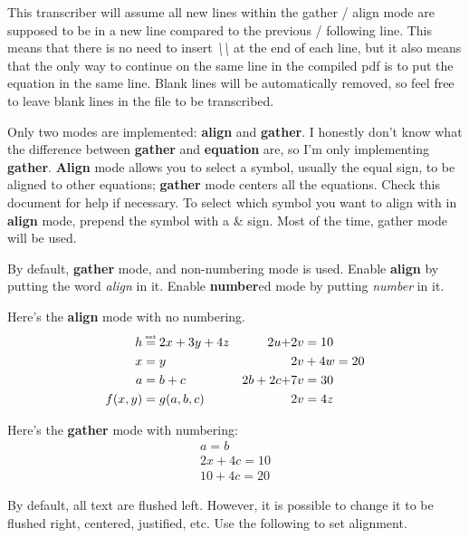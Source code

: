 \documentclass[12pt]{article}
\newcommand{\pytexset}{\mathrel{\stackrel{\makebox[0pt]{\mbox{\normalfont\tiny set}}}{=}}}
\begin{document}
\begin{flushleft}
\medskip

This transcriber will assume all new lines within the gather / align mode are supposed to be in a new line compared to the previous / following line. This means that there is no need to insert \emph{\textbackslash\textbackslash} at the end of each line, but it also means that the only way to continue on the same line in the compiled pdf is to put the equation in the same line. Blank lines will be automatically removed, so feel free to leave blank lines in the file to be transcribed.

\medskip

Only two modes are implemented: \textbf{align} and \textbf{gather}. I honestly don't know what the difference between \textbf{gather} and \textbf{equation} are, so I'm only implementing \textbf{gather}. \textbf{Align} mode allows you to select a symbol, usually the equal sign, to be aligned to other equations; \textbf{gather} mode centers all the equations. Check this document for help if necessary. To select which symbol you want to align with in \textbf{align} mode, prepend the symbol with a \& sign. Most of the time, gather mode will be used.

\medskip

By default, \textbf{gather} mode, and non-numbering mode is used. Enable \textbf{align} by putting the word \emph{align} in it. Enable \textbf{number}ed mode by putting \emph{number} in it.

\medskip

Here's the \textbf{align} mode with no numbering.
\begin{align*}
h &\pytexset 2x + 3y + 4z		&	2u + &2v = 10 \\
x &= y						&	&2v + 4w = 20 \\
a &= b + c					&	2b + 2c + &7v = 30\\
f(x, y) &= g(a, b, c)		&	&2v = 4z 
\end{align*}

\medskip

Here's the \textbf{gather} mode with numbering:
\begin{gather}
a = b \\
2x + 4c = 10 \\
10 + 4c = 20 
\end{gather}

\bigskip

By default, all text are flushed left. However, it is possible to change it to be flushed right, centered, justified, etc. Use the following to set alignment.

\end{flushleft}
\end{document}
